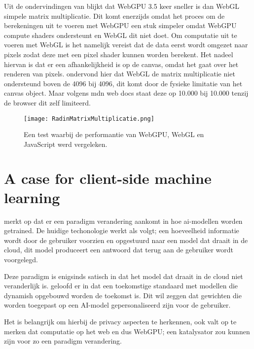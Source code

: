 Uit de ondervindingen van \textcite{Radin2021} blijkt dat WebGPU 3.5 keer sneller is dan WebGL simpele matrix multiplicatie. Dit komt enerzijds omdat het proces om de berekeningen uit te voeren met WebGPU een stuk simpeler omdat WebGPU compute shaders ondersteunt en WebGL dit niet doet. Om computatie uit te voeren met WebGL is het namelijk vereist dat de data eerst wordt omgezet naar pixels zodat deze met een pixel shader kunnen worden berekent. Het nadeel hiervan is dat er een afhankelijkheid is op de canvas, omdat het gaat over het renderen van pixels. \textcite{Radin2021} ondervond hier dat WebGL de matrix multiplicatie niet ondersteund boven de 4096 bij 4096, dit komt door de fysieke limitatie van het canvas object. Maar volgens mdn web docs staat deze op 10.000 bij 10.000 tenzij de browser dit zelf limiteerd.

\begin{figure}
    \texttt{[image: RadinMatrixMultiplicatie.png]}
    \caption[Matrixvermenigvuldiging test \autocite{Radin2021}]{Een test waarbij de performantie van WebGPU, WebGL en JavaScript werd vergeleken.  \autocite{Radin2021}}
    \label{fig:Matrix Multiplication By Radin}
\end{figure}

\break{}

\section{A case for client-side machine learning} %

\textcite{Fleetwood2022} merkt op dat er een paradigm verandering aankomt in hoe ai-modellen worden getrained. De huidige techonologie werkt als volgt; een hoeveelheid informatie wordt door de gebruiker voorzien en opgestuurd naar een model dat draait in de cloud, dit model produceert een antwoord dat terug aan de gebruiker wordt voorgelegd.

\bigbreak{}

Deze paradigm is enigsinds satisch in dat het model dat draait in de cloud niet veranderlijk is. \textcite{Fleetwood2022} geloofd er in dat een toekomstige standaard met modellen die dynamish opgebouwd worden de toekomst is. Dit wil zeggen dat gewichten die worden toegepast op een AI-model gepersonaliseerd zijn voor de gebruiker.

\bigbreak{}

Het is belangrijk om hierbij de privacy aspecten te herkennen, ook valt op te merken dat computatie op het web en dus WebGPU; een katalysator zou kunnen zijn voor zo een paradigm verandering.

